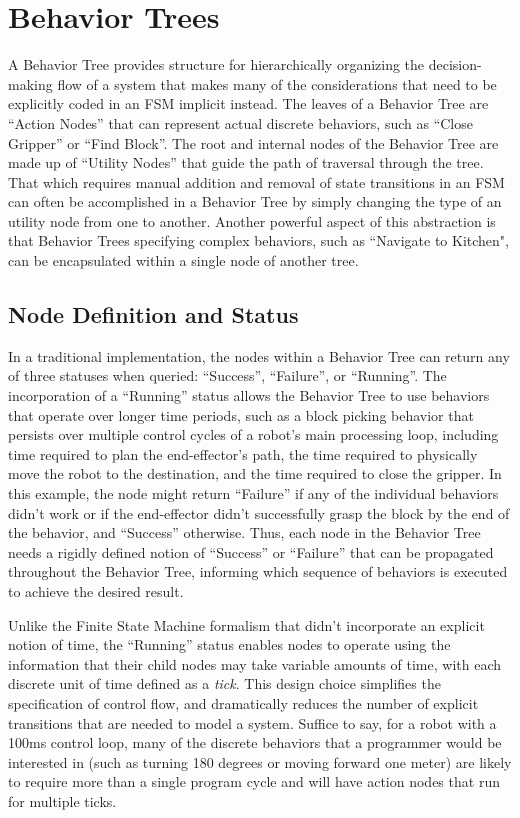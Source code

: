 \section{Behavior Trees}\label{sec:behaviortrees}
A Behavior Tree \cite{colledanchise2018behavior} provides structure for hierarchically organizing the decision-making flow of a system that makes many of the considerations that need to be explicitly coded in an FSM implicit instead. The leaves of a Behavior Tree are ``Action Nodes'' that can represent actual discrete behaviors, such as ``Close Gripper'' or ``Find Block''. The root and internal nodes of the Behavior Tree are made up of ``Utility Nodes'' that guide the path of traversal through the tree. That which requires manual addition and removal of state transitions in an FSM can often be accomplished in a Behavior Tree by simply changing the type of an utility node from one to another. Another powerful aspect of this abstraction is that Behavior Trees specifying complex behaviors, such as ``Navigate to Kitchen", can be encapsulated within a single node of another tree.

\subsection{Node Definition and Status}
In a traditional implementation, the nodes within a Behavior Tree can return any of three statuses when queried: ``Success'', ``Failure'', or ``Running''. The incorporation of a ``Running'' status allows the Behavior Tree to use behaviors that operate over longer time periods, such as a block picking behavior that persists over multiple control cycles of a robot's main processing loop, including time required to plan the end-effector's path, the time required to physically move the robot to the destination, and the time required to close the gripper. In this example, the node might return ``Failure'' if any of the individual behaviors didn't work or if the end-effector didn't successfully grasp the block by the end of the behavior, and ``Success'' otherwise. Thus, each node in the Behavior Tree needs a rigidly defined notion of ``Success'' or ``Failure'' that can be propagated throughout the Behavior Tree, informing which sequence of behaviors is executed to achieve the desired result.

Unlike the Finite State Machine formalism that didn't incorporate an explicit notion of time, the ``Running'' status enables nodes to operate using the information that their child nodes may take variable amounts of time, with each discrete unit of time defined as a \emph{tick}. This design choice simplifies the specification of control flow, and dramatically reduces the number of explicit transitions that are needed to model a system. Suffice to say, for a robot with a 100ms control loop, many of the discrete behaviors that a programmer would be interested in (such as turning 180 degrees or moving forward one meter) are likely to require more than a single program cycle and will have action nodes that run for multiple ticks.

